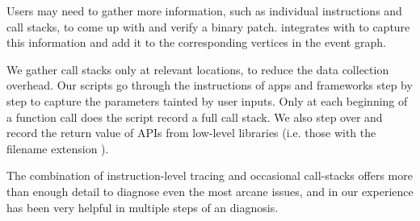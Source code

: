 Users may need to gather more information, such as individual instructions and
call stacks, to come up with and verify a binary patch. \xxx integrates with
 to capture this information and add it to the corresponding vertices
in the event graph.

We gather call stacks only at relevant locations, to reduce the data collection
overhead. Our  scripts go through the instructions of apps and
frameworks step by step to capture the parameters tainted by user inputs. Only
at each beginning of a function call does the script record a full call stack.
We also step over and record the return value of APIs from low-level libraries
(i.e. those with the filename extension ).

The combination of instruction-level tracing and occasional call-stacks offers
more than enough detail to diagnose even the most arcane issues, and in our
experience has been very helpful in multiple steps of an \xxx diagnosis.

